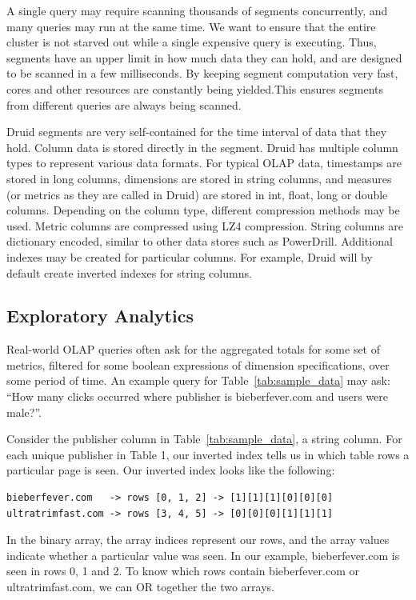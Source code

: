 \documentclass{vldb}
\begin{document}
A single query may require scanning thousands of segments concurrently, and
many queries may run at the same time. We want to ensure that the entire
cluster is not starved out while a single expensive query is executing. Thus,
segments have an upper limit in how much data they can hold, and are designed
to be scanned in a few milliseconds. By keeping segment computation very fast,
cores and other resources are constantly being yielded.This ensures segments
from different queries are always being scanned.

Druid segments are very self-contained for the time interval of data that they
hold. Column data is stored directly in the segment. Druid has multiple column
types to represent various data formats. For typical OLAP data, timestamps are
stored in long columns, dimensions are stored in string columns, and measures
(or metrics as they are called in Druid) are stored in int, float, long or
double columns. Depending on the column type, different compression methods may
be used. Metric columns are compressed using LZ4\cite{collet2013lz4}
compression. String columns are dictionary encoded, similar to other data
stores such as PowerDrill\cite{hall2012processing}.  Additional indexes may be
created for particular columns. For example, Druid will by default create
inverted indexes for string columns.

\subsection{Exploratory Analytics}

Real-world OLAP queries often ask for the aggregated totals for some set of
metrics, filtered for some boolean expressions of dimension specifications,
over some period of time. An example query for Table~\ref{tab:sample_data} may
ask: “How many clicks occurred where publisher is bieberfever.com and users
were male?”. 

Consider the publisher column in Table~\ref{tab:sample_data}, a string column.
For each unique publisher in Table 1, our inverted index tells us in which
table rows a particular page is seen. Our inverted index looks like the
following:

{\small\begin{verbatim}
bieberfever.com   -> rows [0, 1, 2] -> [1][1][1][0][0][0]
ultratrimfast.com -> rows [3, 4, 5] -> [0][0][0][1][1][1]
\end{verbatim}}

In the binary array, the array indices represent our rows, and the array values
indicate whether a particular value was seen. In our example, bieberfever.com
is seen in rows 0, 1 and 2. To know which rows contain bieberfever.com or
ultratrimfast.com, we can OR together the two arrays.
\end{document}
